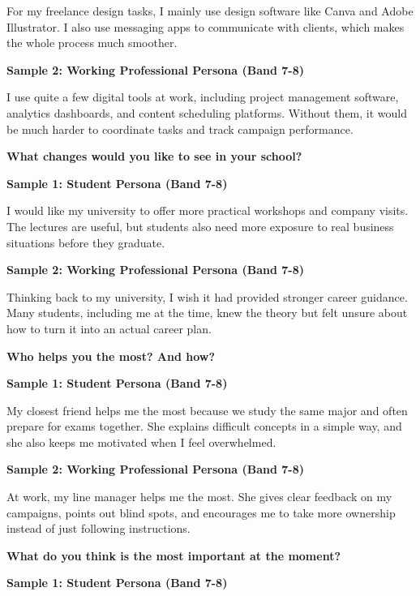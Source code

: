 For my freelance design tasks, I mainly use design software like Canva and Adobe Illustrator. I also use messaging apps to communicate with clients, which makes the whole process much smoother.

\textbf{Sample 2: Working Professional Persona (Band 7-8)}

I use quite a few digital tools at work, including project management software, analytics dashboards, and content scheduling platforms. Without them, it would be much harder to coordinate tasks and track campaign performance.

\separator

\begin{ieltsquestion}
\textbf{What changes would you like to see in your school?}
\end{ieltsquestion}
\textbf{Sample 1: Student Persona (Band 7-8)}

I would like my university to offer more practical workshops and company visits. The lectures are useful, but students also need more exposure to real business situations before they graduate.

\textbf{Sample 2: Working Professional Persona (Band 7-8)}

Thinking back to my university, I wish it had provided stronger career guidance. Many students, including me at the time, knew the theory but felt unsure about how to turn it into an actual career plan.

\separator

\begin{ieltsquestion}
\textbf{Who helps you the most? And how?}
\end{ieltsquestion}
\textbf{Sample 1: Student Persona (Band 7-8)}

My closest friend helps me the most because we study the same major and often prepare for exams together. She explains difficult concepts in a simple way, and she also keeps me motivated when I feel overwhelmed.

\textbf{Sample 2: Working Professional Persona (Band 7-8)}

At work, my line manager helps me the most. She gives clear feedback on my campaigns, points out blind spots, and encourages me to take more ownership instead of just following instructions.

\separator

\begin{ieltsquestion}
\textbf{What do you think is the most important at the moment?}
\end{ieltsquestion}
\textbf{Sample 1: Student Persona (Band 7-8)}


